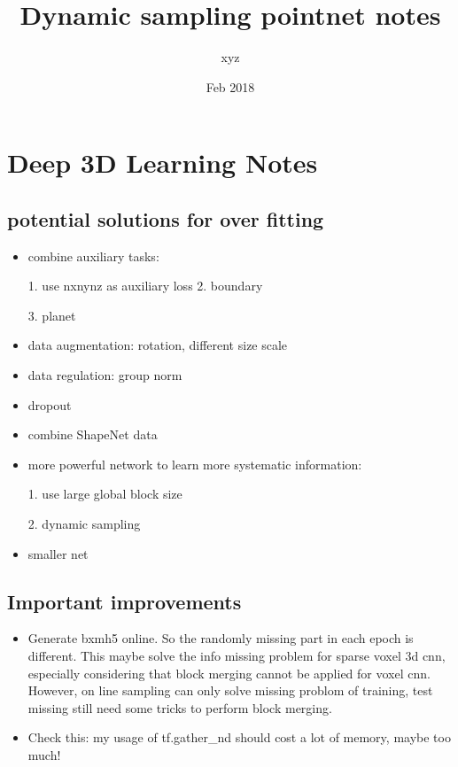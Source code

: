 \documentclass{article}
\title{Dynamic sampling pointnet notes}
\author{xyz}
\date{Feb 2018}
\begin{document}
\noindent
\begin{titlepage}
\maketitle
\end{titlepage}	

\tableofcontents{}
\section{Deep 3D Learning Notes}

\subsection{potential solutions for over fitting}
\begin{itemize}
	\item combine auxiliary tasks:\par 
	1. use nxnynz as auxiliary loss
	2. boundary \par 
	3. planet \par 
	\item data augmentation: rotation, different size scale
	\item data regulation: group norm
	\item dropout
	\item combine ShapeNet data
	\item more powerful network to learn more systematic information:\par
	1. use large global block size\par
	2. dynamic sampling
	\item smaller net
\end{itemize}

\subsection{Important improvements}
\begin{itemize}
	\item Generate bxmh5 online. So the randomly missing part in each epoch is different. This maybe solve the info missing problem for sparse voxel 3d cnn, especially considering that block merging cannot be applied for voxel cnn. However, on line sampling can only solve missing problom of training, test missing still need some tricks to perform block merging.
	\item Check this: my usage of tf.gather\_nd should cost a lot of memory, maybe too much!
\end{itemize}
\end{document}
